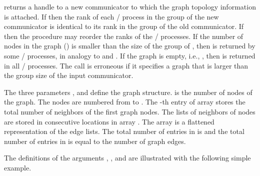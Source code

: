  returns a handle to a new communicator to which the
graph topology information is attached.  If  then the
rank of each \MPI/ process in the group of the new communicator is identical to its rank in the
group of the old communicator.  If  then the procedure may 
reorder the ranks of the \MPI/ processes.  If the number of nodes in the graph
() is smaller than the size of the group of
, then  is returned by some \MPI/ processes, in
analogy to  and .
If the graph is empty, i.e., ,
then  is returned in all \MPI/ processes. 
The call
is erroneous if it specifies a graph that is larger than the group size of the
input communicator.

The three parameters ,  and  define the graph
structure.
 is the number of nodes of the graph.   The nodes are numbered
from  to .
The 
-th 
entry of array  stores the total number of
neighbors of the first  graph nodes.   The lists of neighbors of
nodes  are stored in consecutive locations in array
.  The array  is a flattened representation
of the edge lists.
The total number of entries in  is  and
the total number of entries in  is equal to the number of
graph edges.

The definitions of the arguments , , and
 are illustrated with the following simple example.

